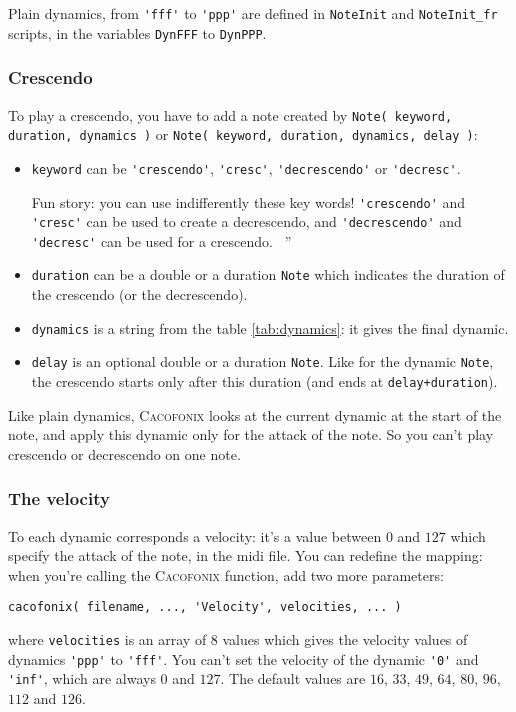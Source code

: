 \documentclass{article}
\newcommand\cacofonix{\textsc{Cacofonix}\xspace}
\newenvironment{meenv}{ \par \noindent \makebox[6em][r]{ \textcolor{mecolor}{Me}: `` --~}}{~''}
\newcommand{ \me }[1]{%
\begin{meenv}%
	#1%
\end{meenv} }
\begin{document}
Plain dynamics, from \lstinline!'fff'! to \lstinline!'ppp'! are defined in \lstinline!NoteInit! and \lstinline!NoteInit_fr! scripts, in the variables \lstinline!DynFFF! to \lstinline!DynPPP!.

\subsubsection{Crescendo}
\label{sec:Crescendo}

To play a crescendo, you have to add a note created by \lstinline!Note( keyword, duration, dynamics )! or \lstinline!Note( keyword, duration, dynamics, delay )!:
\begin{itemize}
	\item \lstinline!keyword! can be \lstinline!'crescendo'!, \lstinline!'cresc'!, \lstinline!'decrescendo'! or \lstinline!'decresc'!.
		\me{Fun story: you can use indifferently these key words! \lstinline!'crescendo'! and \lstinline!'cresc'! can be used to create a decrescendo, and \lstinline!'decrescendo'! and \lstinline!'decresc'! can be used for a crescendo.}
	\item \lstinline!duration! can be a double or a duration \lstinline!Note! which indicates the duration of the crescendo (or the decrescendo).
	\item \lstinline!dynamics! is a string from the table \ref{tab:dynamics}: it gives the final dynamic.
	\item \lstinline!delay! is an optional double or a duration \lstinline!Note!. Like for the dynamic \lstinline!Note!, the crescendo starts only after this duration (and ends at \lstinline!delay+duration!).
\end{itemize}

Like plain dynamics, \cacofonix looks at the current dynamic at the start of the note, and apply this dynamic only for the attack of the note. So you can't play crescendo or decrescendo on one note.

\subsubsection{The velocity}
\label{sec:Velocity}

To each dynamic corresponds a velocity: it's a value between $0$ and $127$ which specify the attack of the note, in the midi file. You can redefine the mapping: when you're calling the \cacofonix function, add two more parameters:
\begin{lstlisting}
cacofonix( filename, ..., 'Velocity', velocities, ... )
\end{lstlisting}
where \lstinline!velocities! is an array of $8$ values which gives the velocity values of dynamics \lstinline!'ppp'! to \lstinline!'fff'!. You can't set the velocity of the dynamic \lstinline!'0'! and \lstinline!'inf'!, which are always $0$ and $127$. The default values are $16$, $33$, $49$, $64$, $80$, $96$, $112$ and $126$.
\end{document}
